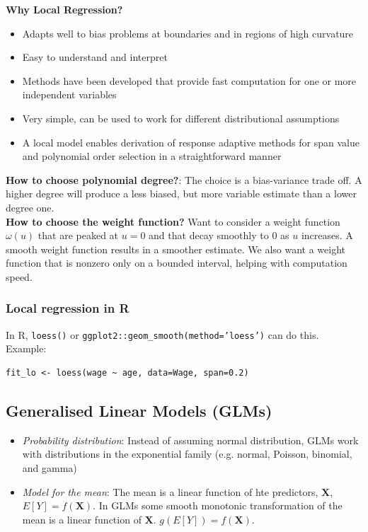 \documentclass[11pt]{article}
\begin{document}
\noindent \textbf{Why Local Regression?}
\begin{itemize}
    \item Adapts well to bias problems at boundaries and in regions of high curvature
    \item Easy to understand and interpret
    \item Methods have been developed that provide fast computation for one or more independent variables
    \item Very simple, can be used to work for different distributional assumptions
    \item A local model enables derivation of response adaptive methods for span value and polynomial order selection in a straightforward manner
\end{itemize} \phantom{i}

\noindent \textbf{How to choose polynomial degree?}: The choice is a bias-variance trade off. A higher degree will produce a less biased, but more variable estimate than a lower degree one. \\

\noindent \textbf{How to choose the weight function?} Want to consider a weight function $\omega(u)$ that are peaked at $u=0$ and that decay smoothly to $0$ as $u$ increases. A smooth weight function results in a smoother estimate. We also want a weight function that is nonzero only on a bounded interval, helping with computation speed.

\subsubsection{Local regression in R}
\noinednt In R, \texttt{loess()} or \texttt{ggplot2::geom\_smooth(method='loess')} can do this. Example:
\begin{verbatim}
fit_lo <- loess(wage ~ age, data=Wage, span=0.2)
\end{verbatim}

\subsection{Generalised Linear Models (GLMs)}
\begin{itemize}
    \item \textit{Probability distribution}: Instead of assuming normal distribution, GLMs work with distributions in the exponential family (e.g. normal, Poisson, binomial, and gamma)
    \item \textit{Model for the mean}: The mean is a linear function of hte predictors, $\boldsymbol{X}$, $E[Y] = f(\boldsymbol{X})$. In GLMs some smooth monotonic transformation of the mean is a linear function of $\boldsymbol{X}$. $g(E[Y]) = f(\boldsymbol{X})$.
\end{itemize} \phantom{i}
\end{document}
